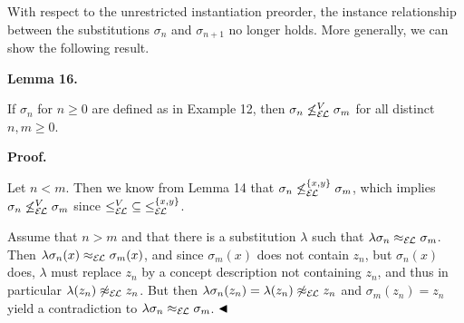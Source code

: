  
With respect to the unrestricted instantiation preorder, the instance relationship between the substitutions $\sigma_{n}$ and $\sigma_{n+1}$ no longer holds. More generally, we can show the following result.\par
 
 
 
\par\medskip\noindent\textbf{Lemma 16.}\par
 
 
If $\sigma_{n}$ for $n\geq 0$ are defined as in Example 12, then $\sigma_{n}\not\leq_{\mathcal{E\mkern-1.618muL}}^{V}\sigma_{m}$ for all distinct $n,m\geq 0$.\par
 
 
 
 
 
\par\medskip\noindent\textbf{Proof.}\par
 
 
Let $n<m$. Then we know from Lemma 14 that $\sigma_{n}\not\leq_{\mathcal{E\mkern-1.618muL}}^{\{x,y\}}\sigma_{m}$, which implies $\sigma_{n}\not\leq_{\mathcal{E\mkern-1.618muL}}^{V}\sigma_{m}$ since ${\leq_{\mathcal{E\mkern-1.618muL}}^{V}}\subseteq{\leq_{\mathcal{E\mkern-1.618%
muL}}^{\{x,y\}}}$.\par
 
 
 
Assume that $n>m$ and that there is a substitution $\lambda$ such that $\lambda\sigma_{n}\approx_{\mathcal{E\mkern-1.618muL}}\sigma_{m}$. Then $\lambda\sigma_{n}(x)\approx_{\mathcal{E\mkern-1.618muL}}\sigma_{m}(x)$, and since $\sigma_{m}(x)$ does not contain $z_{n}$, but $\sigma_{n}(x)$ does, $\lambda$ must replace $z_{n}$ by a concept description not containing $z_{n}$, and thus in particular $\lambda(z_{n})\not\approx_{\mathcal{E\mkern-1.618muL}}z_{n}$. But then $\lambda\sigma_{n}(z_{n})=\lambda(z_{n})\not\approx_{\mathcal{E\mkern-1.618muL}%
}z_{n}$ and $\sigma_{m}(z_{n})=z_{n}$ yield a contradiction to $\lambda\sigma_{n}\approx_{\mathcal{E\mkern-1.618muL}}\sigma_{m}$. $\hfill\blacktriangleleft$\par
 
